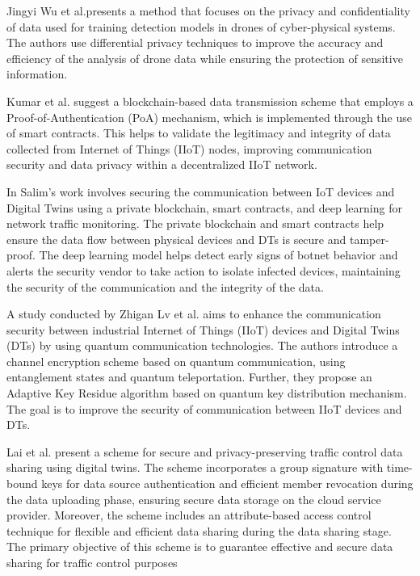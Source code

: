 Jingyi Wu et al.\cite{wuDeepLearningDriven2022}presents a method that focuses on the privacy and confidentiality of data used for training detection models in drones of cyber-physical systems. The authors use differential privacy techniques to improve the accuracy and efficiency of the analysis of drone data while ensuring the protection of sensitive information. 

Kumar et al.\cite{kumarBlockchainDeepLearning2022} suggest a blockchain-based data transmission scheme that employs a Proof-of-Authentication (PoA) mechanism, which is implemented through the use of smart contracts. This helps to validate the legitimacy and integrity of data collected from Internet of Things (IIoT) nodes, improving communication security and data privacy within a decentralized IIoT network.  

In \cite{salimBlockchainEnabledSecureDigital2022} Salim's work involves securing the communication between IoT devices and Digital Twins using a private blockchain, smart contracts, and deep learning for network traffic monitoring. The private blockchain and smart contracts help ensure the data flow between physical devices and DTs is secure and tamper-proof. The deep learning model helps detect early signs of botnet behavior and alerts the security vendor to take action to isolate infected devices, maintaining the security of the communication and the integrity of the data.  


A study conducted by Zhigan Lv et al.\cite{lvDigitalTwinsBased2022} aims to enhance the communication security between industrial Internet of Things (IIoT) devices and Digital Twins (DTs) by using quantum communication technologies. The authors introduce a channel encryption scheme based on quantum communication, using entanglement states and quantum teleportation. Further, they propose an Adaptive Key Residue algorithm based on quantum key distribution mechanism. The goal is to improve the security of communication between IIoT devices and DTs.

Lai et al.\cite{chengzhelaiSPDTSecurePrivacyPreserving2022} present a scheme for secure and privacy-preserving traffic control data sharing using digital twins. The scheme incorporates a group signature with time-bound keys for data source authentication and efficient member revocation during the data uploading phase, ensuring secure data storage on the cloud service provider. Moreover, the scheme includes an attribute-based access control technique for flexible and efficient data sharing during the data sharing stage. The primary objective of this scheme is to guarantee effective and secure data sharing for traffic control purposes

